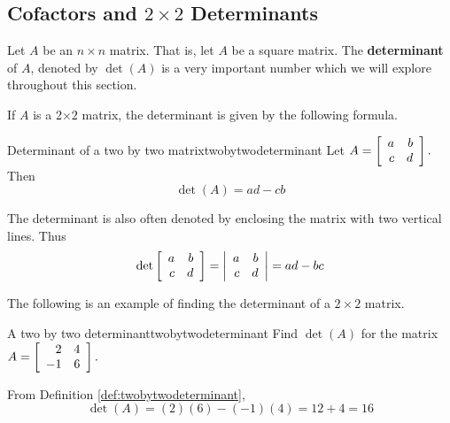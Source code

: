 \subsection{Cofactors and \texorpdfstring{$2\times 2$}{2x2} Determinants}

Let $A$ be an $n\times n$ matrix. That is, let $A$ be a square matrix. The \textbf{determinant} of $A$, denoted
by $\det \left( A\right) $ is a very important number which we will explore throughout this section. 

If $A$ is a 2$\times 2$
matrix, the determinant is given by the following formula.

\begin{definition}{Determinant of a two by two matrix}{twobytwodeterminant}
Let $A=\left[
\begin{array}{rr}
a & b \\
c & d
\end{array}
\right] .$ Then
\begin{equation*}
\det \left( A\right)  = ad-cb
\end{equation*}
\end{definition}

The determinant is also often denoted by enclosing the matrix with two
vertical lines. Thus
\begin{equation*}
\det \left[
\begin{array}{rr}
a & b \\
c & d
\end{array}
\right] =\left|
\begin{array}{rr}
a & b \\
c & d
\end{array}
\right| 
=ad - bc
\end{equation*}

The following is an example of finding the determinant of a $2 \times 2$ matrix.

\begin{example}{A two by two determinant}{twobytwodeterminant}
Find $\det\left(A\right) $ for the matrix
$A =  \left[
\begin{array}{rr}
2 & 4 \\
-1 & 6
\end{array}
\right] .$
\end{example}

\begin{solution} From Definition \ref{def:twobytwodeterminant},
\begin{equation*}
\det \left( A\right) = \left( 2\right) \left( 6\right) -\left(
-1\right) \left( 4\right) = 12 + 4 = 16
\end{equation*}
\end{solution} 

